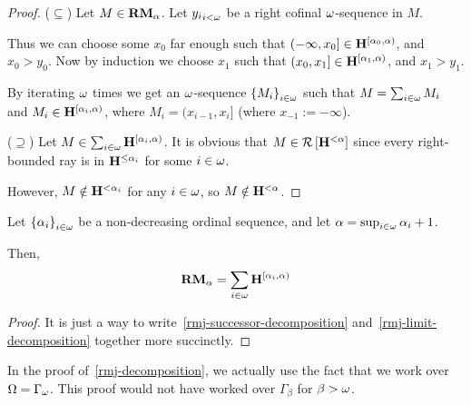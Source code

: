 \begin{proof}
  ($\subseteq$) Let $M \in \mathbf{RM}_{\alpha}$.
  Let ${y_i}_{i < \omega}$ be a right cofinal $\omega$-sequence in $M$.

  Thus we can choose some $x_0$ far enough such that $(-\infty, x_0] \in \mathbf{H}^{[\alpha_0, \alpha)}$,
          and $x_0 > y_0$.
          Now by induction we choose $x_1$ such that $(x_0, x_1] \in \mathbf{H}^{[\alpha_1, \alpha)}$,
  and $x_1 > y_1$.

  By iterating $\omega$ times we get an $\omega$-sequence $\left\{ {M_i} \right\}_{i \in \omega}$
  such that $M = \sum_{i \in \omega} M_i$ and $M_i \in \mathbf{H}^{[\alpha_i, \alpha)}$,
          where $M_i = (x_{i-1}, x_i]$ (where $x_{-1} := -\infty$).


  ($\supseteq$) Let $M \in \sum_{i \in \omega}{\mathbf{H}^{[\alpha_i, \alpha)}}$.
  It is obvious that $M \in \mathcal{R} \left[ {\mathbf{H}^{< \alpha}} \right]$ since every right-bounded
  ray is in $\mathbf{H}^{\le \alpha_i}$ for some $i \in \omega$.

  However, $M \notin \mathbf{H}^{< \alpha_i}$ for any $i \in \omega$, so $M \notin \mathbf{H}^{< \alpha}$.


\end{proof}

\begin{lemma}\label{rmj-decomposition}
  Let $\left\{ {\alpha_i} \right\}_{i \in \omega}$ be a non-decreasing ordinal sequence,
  and let $\alpha = \sup_{i \in \omega} {\alpha_i + 1}$.

  Then,
  \[
    \mathbf{RM}_{\alpha} = \sum_{i \in \omega}{\mathbf{H}^{[\alpha_i, \alpha)}}
  \]
\end{lemma}

\begin{proof}
  It is just a way to
  write~\cref{rmj-successor-decomposition}
  and~\cref{rmj-limit-decomposition}
  together more succinctly.
\end{proof}

\begin{note}
  In the proof of~\cref{rmj-decomposition}, we actually use the fact that
  we work over $\Omega = \Gamma_{\omega}$. This proof would not have worked over $\Gamma_{\beta}$
  for $\beta > \omega$.
\end{note}
